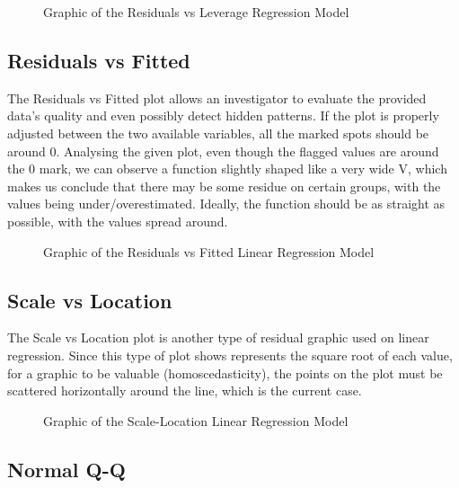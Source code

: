 \documentclass[conference]{IEEEtran}
\begin{document}
\begin{figure}[htbp]
    \caption{Graphic of the Residuals vs Leverage Regression Model}
    \label{residualsLeverage}
\end{figure}

\subsection{Residuals vs Fitted}

The Residuals vs Fitted plot allows an investigator to evaluate the provided data's quality and even possibly detect hidden patterns.
If the plot is properly adjusted between the two available variables, all the marked spots should be around 0. Analysing the given plot, even though the flagged values are around the 0 mark, 
we can observe a function slightly shaped like a very wide V, which makes us conclude that there may be some residue on certain groups, with the values being under/overestimated.
Ideally, the function should be as straight as possible, with the values spread around.

\begin{figure}[htbp]
    \caption{Graphic of the Residuals vs Fitted Linear Regression Model}
    \label{residualsFitted}
\end{figure}

\subsection{Scale vs Location}

The Scale vs Location plot is another type of residual graphic used on linear regression.
Since this type of plot shows represents the square root of each value, for a graphic to be valuable (homoscedasticity), 
the points on the plot must be scattered horizontally around the line, which is the current case.

\begin{figure}[htbp]
    \caption{Graphic of the Scale-Location Linear Regression Model}
    \label{scaleLocation}
\end{figure}

\subsection{Normal Q-Q}
\end{document}

